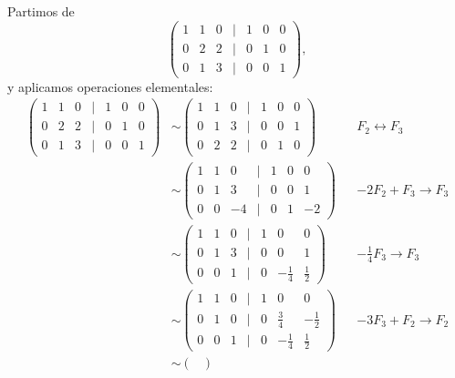 \documentclass[11pt,respuestas,a4]{aleph-examen}
\begin{document}
\begin{preguntas}
\begin{respuesta}
    Partimos de
    \[
        \begin{pmatrix}
            1 & 1 & 0 & | & 1 & 0 & 0 \\
            0 & 2 & 2 & | & 0 & 1 & 0 \\
            0 & 1 & 3 & | & 0 & 0 & 1
        \end{pmatrix},
    \]
    y aplicamos operaciones elementales:
    \begin{align*}
        \begin{pmatrix}
            1 & 1 & 0 & | & 1 & 0 & 0 \\
            0 & 2 & 2 & | & 0 & 1 & 0 \\
            0 & 1 & 3 & | & 0 & 0 & 1
        \end{pmatrix}
        &\sim
        \begin{pmatrix}
            1 & 1 & 0 & | & 1 & 0 & 0 \\
            0 & 1 & 3 & | & 0 & 0 & 1 \\
            0 & 2 & 2 & | & 0 & 1 & 0
        \end{pmatrix} && F_2\leftrightarrow F_3 \\
        &\sim
        \begin{pmatrix}
            1 & 1 & 0 & | & 1 & 0 & 0 \\
            0 & 1 & 3 & | & 0 & 0 & 1 \\
            0 & 0 & -4 & | & 0 & 1 & -2
        \end{pmatrix} && -2F_2+F_3\rightarrow F_3 \\
        &\sim
        \begin{pmatrix}
            1 & 1 & 0 & | & 1 & 0 & 0 \\
            0 & 1 & 3 & | & 0 & 0 & 1 \\
            0 & 0 & 1 & | & 0 & -\frac{1}{4} & \frac{1}{2}
        \end{pmatrix} && -\frac{1}{4}F_3\rightarrow F_3 \\
        &\sim
        \begin{pmatrix}
            1 & 1 & 0 & | & 1 & 0 & 0 \\
            0 & 1 & 0 & | & 0 & \frac{3}{4} & -\frac{1}{2} \\
            0 & 0 & 1 & | & 0 & -\frac{1}{4} & \frac{1}{2}
        \end{pmatrix} && -3F_3+F_2\rightarrow F_2 \\
        &\sim
        \begin{pmatrix}

\end{pmatrix}
\end{align*}
\end{respuesta}
\end{preguntas}
\end{document}
